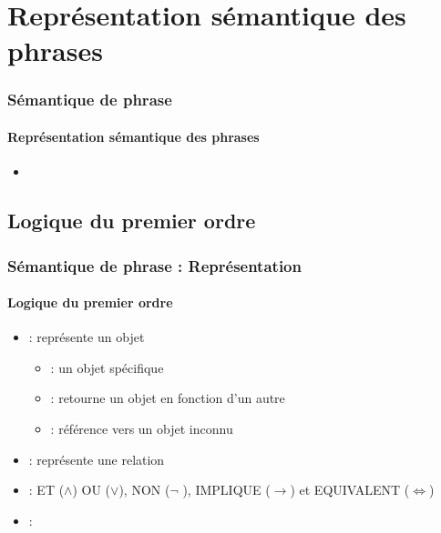 \documentclass[xcolor=table]{beamer}
\begin{document}
\section{Représentation sémantique des phrases}

\begin{frame}
	\frametitle{Sémantique de phrase}
	\framesubtitle{Représentation sémantique des phrases}
	
	\begin{itemize}
		\item 
	\end{itemize}
	
\end{frame}

\subsection{Logique du premier ordre}

\begin{frame}
	\frametitle{Sémantique de phrase : Représentation}
	\framesubtitle{Logique du premier ordre}
	
	\begin{itemize}
		\item {} : représente un objet
		\begin{itemize}
			\item {} : un objet spécifique
			
			
			\item {} : retourne un objet en fonction d'un autre
			
			
			\item {} : référence vers un objet inconnu 
			
			
		\end{itemize}
		\item {} : représente une relation 
		
		
		\item {} : ET ($ \wedge $) OU ($ \vee $), NON ($ \neg $ ), IMPLIQUE ($\rightarrow$) et EQUIVALENT ($ \Leftrightarrow $)
		
		
		\item {} : 
		
		
	\end{itemize}
	
\end{frame}
\end{document}
